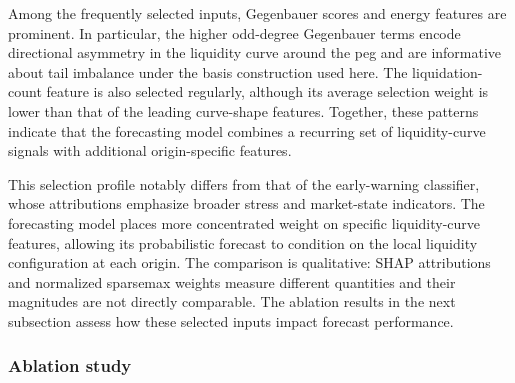 \documentclass[a4paper,fleqn]{cas-sc}
\begin{document}
Among the frequently selected inputs, Gegenbauer scores and energy features are prominent. In particular, the higher odd-degree Gegenbauer terms encode directional asymmetry in the liquidity curve around the peg and are informative about tail imbalance under the basis construction used here. The liquidation-count feature is also selected regularly, although its average selection weight is lower than that of the leading curve-shape features. Together, these patterns indicate that the forecasting model combines a recurring set of liquidity-curve signals with additional origin-specific features.

This selection profile notably differs from that of the early-warning classifier, whose attributions emphasize broader stress and market-state indicators. The forecasting model places more concentrated weight on specific liquidity-curve features, allowing its probabilistic forecast to condition on the local liquidity configuration at each origin. The comparison is qualitative: SHAP attributions and normalized sparsemax weights measure different quantities and their magnitudes are not directly comparable. The ablation results in the next subsection assess how these selected inputs impact forecast performance.

\subsubsection{Ablation study}

\begin{table}
\caption{Mean per-seed percentage change in forecast losses relative to the full model. Brackets report unadjusted 95\% paired Student-$t$ confidence intervals estimated from six seeds. Positive values indicate larger losses and therefore worse performance.}
\label{tab:ablation}
\end{table}
\end{document}
